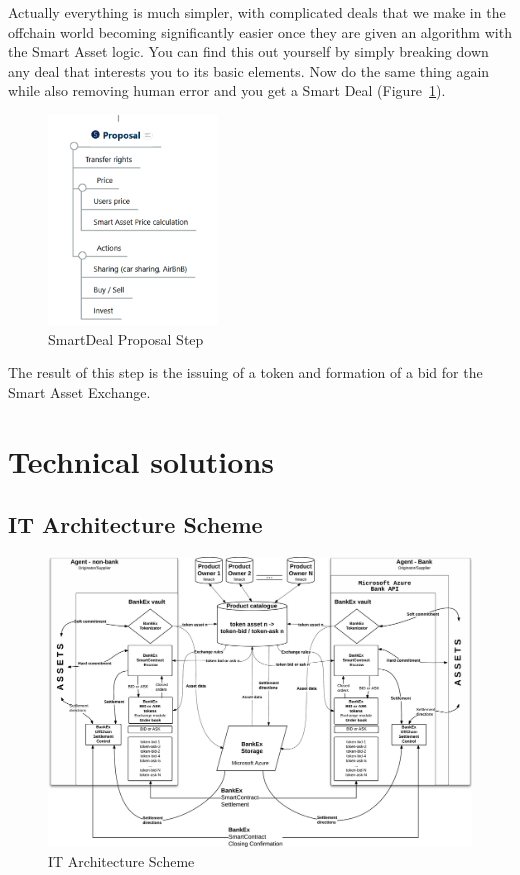 \documentclass{article}
\begin{document}
\begin{multicols}{2}
Actually everything is much simpler, with complicated deals that we make in the offchain world becoming significantly easier once they are given an algorithm with the Smart Asset logic. You can find this out yourself by simply breaking down any deal that interests you  to its basic elements. Now do the same thing again while also removing human error and you get a Smart Deal (Figure~\ref{fig:proposal}).

\begin{figure}
  \centering
  \includegraphics[width=0.4\textwidth]{proposal.png}
  \caption{SmartDeal Proposal Step}
  \label{fig:proposal}
\end{figure}

The result of this step is the issuing of a token and formation of a bid for the Smart Asset Exchange.

\section{Technical solutions}

\subsection{IT Architecture Scheme}

\begin{figure}
  \centering
  \includegraphics[width=\textwidth]{it-architecture.pdf}
  \caption{IT Architecture Scheme}
  \label{fig:it-architecture}
\end{figure}


\end{multicols}
\end{document}
